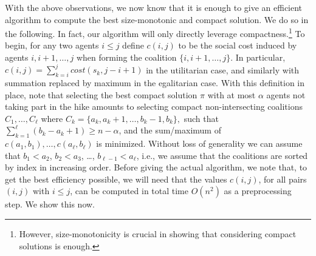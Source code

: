 \documentclass[a4paper,UKenglish,cleveref, autoref, thm-restate]{lipics-v2021}
\newcommand{\cost}{\mathit{cost}}
\begin{document}
\noindent With the above observations, we now know that it is enough to give an efficient algorithm to compute the best size-monotonic and compact solution. We do so in the following. In fact, our algorithm will only directly leverage compactness.\footnote{However, size-monotonicity is crucial in showing that considering compact solutions is enough.} To begin, for any two agents $i \leq j$ define $c(i, j)$ to be the social cost induced by agents $i, i + 1, \ldots, j$ when forming the coalition $\{i, i + 1, \ldots, j\}.$ In particular, $c(i, j) = \sum_{k = i}^{j}\cost(s_k,j - i + 1)$ in the utilitarian case, and similarly with summation replaced by maximum in the egalitarian case. With this definition in place, note that selecting the best compact solution $\pi$ with at most $\alpha$ agents not taking part in the hike amounts to selecting compact non-intersecting coalitions $C_1, \ldots, C_\ell$ 
where $C_k = \{a_k, a_k+1, \ldots, b_k -1, b_k\},$
such that $\sum_{k = 1}^{\ell}(b_k - a_k + 1) \geq n - \alpha$, 
and the sum/maximum of $c(a_1, b_1), \ldots, c(a_\ell, b_\ell)$ is minimized. Without loss of generality we can assume that $b_1 < a_2$, $b_2 < a_3$, \dots, $b_{\ell -1} < a_{\ell}$, i.e., we assume that the coalitions are sorted by index in increasing order. Before giving the actual algorithm, we note that, to get the best efficiency possible, we will need that the values $c(i, j)$, for all pairs $(i, j)$ with $i\leq j$, can be computed in total time $O(n^2)$ as a preprocessing step. We show this now.
\end{document}
